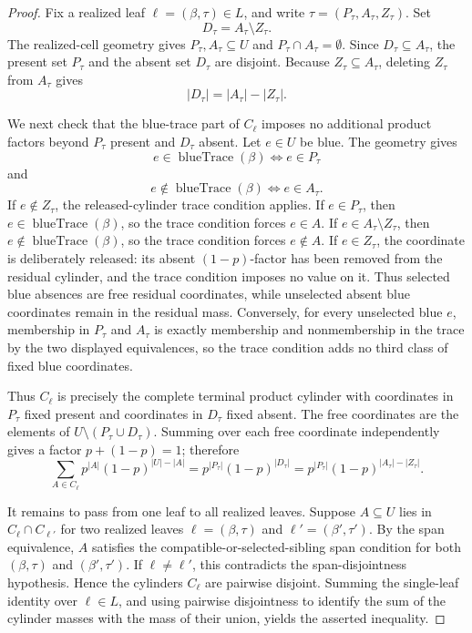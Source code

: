\begin{proof}
Fix a realized leaf \(\ell=(\beta,\tau)\in L\), and write
\(\tau=(P_\tau,A_\tau,Z_\tau)\).  Set
\[
D_\tau=A_\tau\setminus Z_\tau .
\]
The realized-cell geometry gives \(P_\tau,A_\tau\subseteq U\) and
\(P_\tau\cap A_\tau=\emptyset\).  Since \(D_\tau\subseteq A_\tau\), the
present set \(P_\tau\) and the absent set \(D_\tau\) are disjoint.  Because
\(Z_\tau\subseteq A_\tau\), deleting \(Z_\tau\) from \(A_\tau\) gives
\[
|D_\tau|=|A_\tau|-|Z_\tau|.
\]

We next check that the blue-trace part of \(C_\ell\) imposes no additional
product factors beyond \(P_\tau\) present and \(D_\tau\) absent.  Let \(e\in U\)
be blue.  The geometry gives
\[
e\in\operatorname{blueTrace}(\beta)\Longleftrightarrow e\in P_\tau
\]
and
\[
e\notin\operatorname{blueTrace}(\beta)\Longleftrightarrow e\in A_\tau .
\]
If \(e\notin Z_\tau\), the released-cylinder trace condition applies.  If
\(e\in P_\tau\), then \(e\in\operatorname{blueTrace}(\beta)\), so the trace
condition forces \(e\in A\).  If \(e\in A_\tau\setminus Z_\tau\), then
\(e\notin\operatorname{blueTrace}(\beta)\), so the trace condition forces
\(e\notin A\).  If \(e\in Z_\tau\), the coordinate is deliberately released:
its absent \((1-p)\)-factor has been removed from the residual cylinder, and
the trace condition imposes no value on it.  Thus selected blue absences are
free residual coordinates, while unselected absent blue coordinates remain in
the residual mass.  Conversely, for every unselected blue \(e\), membership in
\(P_\tau\) and \(A_\tau\) is exactly membership and nonmembership in the trace
by the two displayed equivalences, so the trace condition adds no third class
of fixed blue coordinates.

Thus \(C_\ell\) is precisely the complete terminal product cylinder with
coordinates in \(P_\tau\) fixed present and coordinates in \(D_\tau\) fixed
absent.  The free coordinates are the elements of
\(U\setminus(P_\tau\cup D_\tau)\).  Summing over each free coordinate
independently gives a factor \(p+(1-p)=1\); therefore
\[
\sum_{A\in C_\ell}p^{|A|}(1-p)^{|U|-|A|}
=p^{|P_\tau|}(1-p)^{|D_\tau|}
=p^{|P_\tau|}(1-p)^{|A_\tau|-|Z_\tau|}.
\]

It remains to pass from one leaf to all realized leaves.  Suppose
\(A\subseteq U\) lies in \(C_\ell\cap C_{\ell'}\) for two realized leaves
\(\ell=(\beta,\tau)\) and \(\ell'=(\beta',\tau')\).  By the span equivalence,
\(A\) satisfies the compatible-or-selected-sibling span condition for both
\((\beta,\tau)\) and \((\beta',\tau')\).  If \(\ell\ne\ell'\), this contradicts
the span-disjointness hypothesis.  Hence the cylinders \(C_\ell\) are
pairwise disjoint.  Summing the single-leaf identity over \(\ell\in L\), and
using pairwise disjointness to identify the sum of the cylinder masses with
the mass of their union, yields the asserted inequality.
\end{proof}
